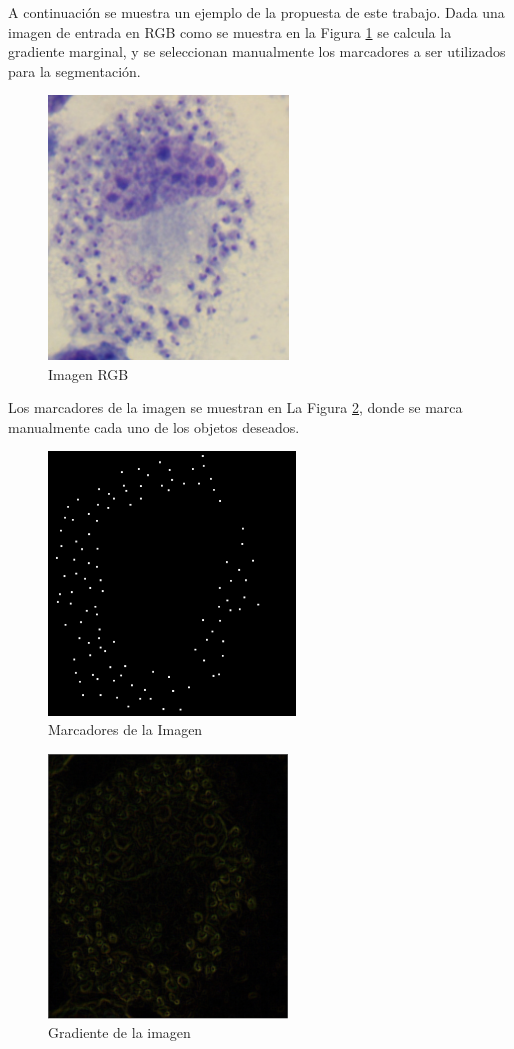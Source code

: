 A continuación se muestra un ejemplo de la propuesta de este trabajo. Dada una imagen de entrada en RGB como se muestra en la Figura \ref{img:imgprop} se calcula la gradiente marginal, y se seleccionan manualmente los marcadores a ser utilizados para la segmentación.
\begin{figure}[h!]
\centering
\includegraphics[height=70mm]{./propuesta/cruzi26.jpg}
\caption{Imagen RGB} 
\label{img:imgprop}
\end{figure}
Los marcadores de la imagen se muestran en La Figura \ref{img:imgmark}, donde se marca manualmente cada uno de los objetos deseados.
\begin{figure}[h!]
\centering
\includegraphics[height=70mm]{./propuesta/marcadores.png}
\caption{Marcadores de la Imagen} 
\label{img:imgmark}
\end{figure}
\begin{figure}[h!]
\centering
\includegraphics[height=70mm]{./propuesta/gradiente.png}
\caption{Gradiente de la imagen}
\label{img:imggrad}
\end{figure}

